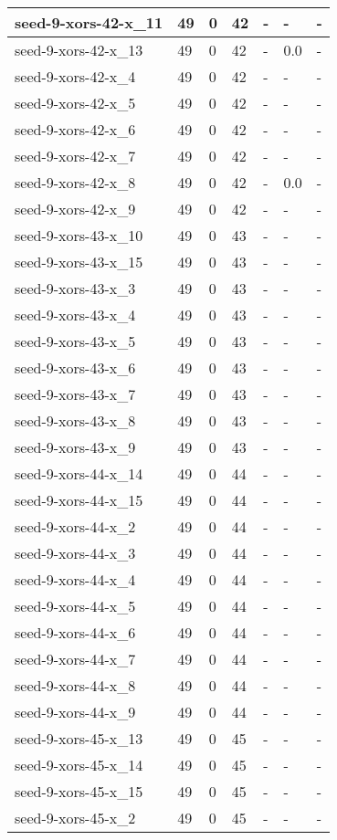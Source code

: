 \begin{scriptsize}
\begin{longtable}{|p{5cm}|l|l|l|l|l|l|}
seed-9-xors-42-x\_11&49&0&42&-&-&- \\ \hline 
seed-9-xors-42-x\_13&49&0&42&-&0.0&- \\ \hline 
seed-9-xors-42-x\_4&49&0&42&-&-&- \\ \hline 
seed-9-xors-42-x\_5&49&0&42&-&-&- \\ \hline 
seed-9-xors-42-x\_6&49&0&42&-&-&- \\ \hline 
seed-9-xors-42-x\_7&49&0&42&-&-&- \\ \hline 
seed-9-xors-42-x\_8&49&0&42&-&0.0&- \\ \hline 
seed-9-xors-42-x\_9&49&0&42&-&-&- \\ \hline 
seed-9-xors-43-x\_10&49&0&43&-&-&- \\ \hline 
seed-9-xors-43-x\_15&49&0&43&-&-&- \\ \hline 
seed-9-xors-43-x\_3&49&0&43&-&-&- \\ \hline 
seed-9-xors-43-x\_4&49&0&43&-&-&- \\ \hline 
seed-9-xors-43-x\_5&49&0&43&-&-&- \\ \hline 
seed-9-xors-43-x\_6&49&0&43&-&-&- \\ \hline 
seed-9-xors-43-x\_7&49&0&43&-&-&- \\ \hline 
seed-9-xors-43-x\_8&49&0&43&-&-&- \\ \hline 
seed-9-xors-43-x\_9&49&0&43&-&-&- \\ \hline 
seed-9-xors-44-x\_14&49&0&44&-&-&- \\ \hline 
seed-9-xors-44-x\_15&49&0&44&-&-&- \\ \hline 
seed-9-xors-44-x\_2&49&0&44&-&-&- \\ \hline 
seed-9-xors-44-x\_3&49&0&44&-&-&- \\ \hline 
seed-9-xors-44-x\_4&49&0&44&-&-&- \\ \hline 
seed-9-xors-44-x\_5&49&0&44&-&-&- \\ \hline 
seed-9-xors-44-x\_6&49&0&44&-&-&- \\ \hline 
seed-9-xors-44-x\_7&49&0&44&-&-&- \\ \hline 
seed-9-xors-44-x\_8&49&0&44&-&-&- \\ \hline 
seed-9-xors-44-x\_9&49&0&44&-&-&- \\ \hline 
seed-9-xors-45-x\_13&49&0&45&-&-&- \\ \hline 
seed-9-xors-45-x\_14&49&0&45&-&-&- \\ \hline 
seed-9-xors-45-x\_15&49&0&45&-&-&- \\ \hline 
seed-9-xors-45-x\_2&49&0&45&-&-&- \\ \hline 

\end{longtable}
\end{scriptsize}
